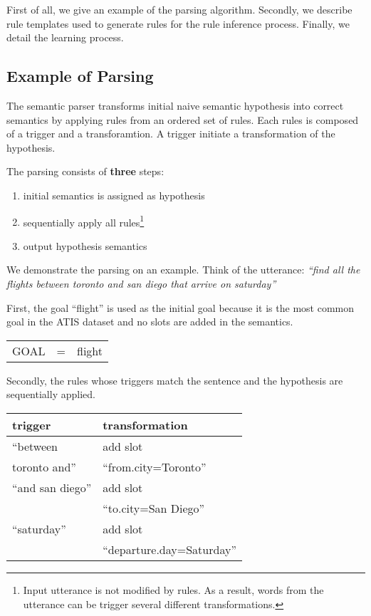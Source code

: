 \documentclass[11pt]{article}
\begin{document}
First of all, we give an example of the parsing algorithm. Secondly, we describe rule templates used to generate rules for the rule inference process. Finally, we detail the learning process. 

\subsection{Example of Parsing} \label{sec:tbl:example}
The semantic parser transforms initial naive semantic hypothesis into correct semantics by applying rules from an ordered set of rules. Each rules is composed of a trigger and a transforamtion. A trigger initiate a transformation of the hypothesis.

The parsing consists of \textbf{three} steps: 
\begin{enumerate}
  \item initial semantics is assigned as hypothesis
  \item sequentially apply all rules\footnote{Input utterance is not modified by rules. As a result, words from the utterance can be trigger several different transformations.}
  \item output hypothesis semantics
\end{enumerate}

We demonstrate the parsing on an example. Think of the utterance: \textit{``find all the flights between toronto and san diego that arrive on saturday''} 

First, the goal ``flight'' is used as the initial goal because it is the most common goal in the ATIS dataset and no slots are added in the semantics.

\vspace{.25cm}
\begin{tabular}{lll}
  GOAL & = & flight
\end{tabular} 
\vspace{.25cm}

Secondly, the rules whose triggers match the sentence and the hypothesis are sequentially applied.

\vspace{.25cm}
\begin{tabular}{ll}
  trigger & transformation \\
  \hline 
  ``between               & add slot \\
    toronto and''         &``from.city=Toronto'' \\
  ``and san diego''       & add slot \\
                          & ``to.city=San Diego'' \\
  ``saturday''            & add slot \\
                          & ``departure.day=Saturday'' \\
\end{tabular} 
\vspace{.25cm}
\end{document}
